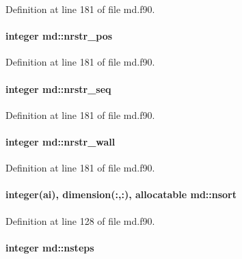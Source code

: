 Definition at line 181 of file md.\-f90.

\hypertarget{classmd_a02282cebebed21d12f2e154a10f66136}{
\paragraph[{nrstr\-\_\-pos}]{\setlength{\rightskip}{0pt plus 5cm}integer md\-::nrstr\-\_\-pos}}\label{classmd_a02282cebebed21d12f2e154a10f66136}


Definition at line 181 of file md.\-f90.

\hypertarget{classmd_a428e318e3b62346513b70cd92ed79d7d}{
\paragraph[{nrstr\-\_\-seq}]{\setlength{\rightskip}{0pt plus 5cm}integer md\-::nrstr\-\_\-seq}}\label{classmd_a428e318e3b62346513b70cd92ed79d7d}


Definition at line 181 of file md.\-f90.

\hypertarget{classmd_a4dade5ed21640405cd882a56f4d27828}{
\paragraph[{nrstr\-\_\-wall}]{\setlength{\rightskip}{0pt plus 5cm}integer md\-::nrstr\-\_\-wall}}\label{classmd_a4dade5ed21640405cd882a56f4d27828}


Definition at line 181 of file md.\-f90.

\hypertarget{classmd_a188ec90acd1a6249684af6b006f36e88}{
\paragraph[{nsort}]{\setlength{\rightskip}{0pt plus 5cm}integer(ai), dimension(\-:,\-:), allocatable md\-::nsort}}\label{classmd_a188ec90acd1a6249684af6b006f36e88}


Definition at line 128 of file md.\-f90.

\hypertarget{classmd_a5475420ffea3758ca4d33e95c8ffc194}{
\paragraph[{nsteps}]{\setlength{\rightskip}{0pt plus 5cm}integer md\-::nsteps}}\label{classmd_a5475420ffea3758ca4d33e95c8ffc194}


